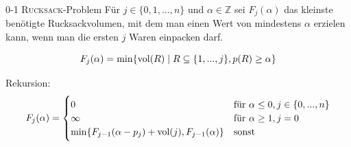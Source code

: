 \begin{frame}{0-1 \textsc{Rucksack}-Problem}
    Für $j \in \{0,1,...,n\}$ und $\alpha \in \mathbb{Z}$ sei $F_j(\alpha)$ das kleinste benötigte Rucksackvolumen, mit dem
    man einen Wert von mindestens $\alpha$ erzielen kann, wenn man die ersten $j$ Waren einpacken darf. 
    
    \begin{equation*}
        F_j(\alpha) = \min\{\operatorname{vol}(R) \mid R \subseteq \{1,...,j\}, p(R) \geq \alpha  \}
    \end{equation*}
    
    Rekursion:
    \begin{equation*}
        F_j(\alpha) = \begin{cases}
        0 & \text{für } \alpha\leq 0, j \in \{0,...,n \} \\
        \infty & \text{für } \alpha\geq 1, j = 0 \\
        \min\{F_{j-1}(\alpha-p_j) + \operatorname{vol}(j), F_{j-1}(\alpha) \} & \text{sonst}
        \end{cases}       
    \end{equation*}
\end{frame}

